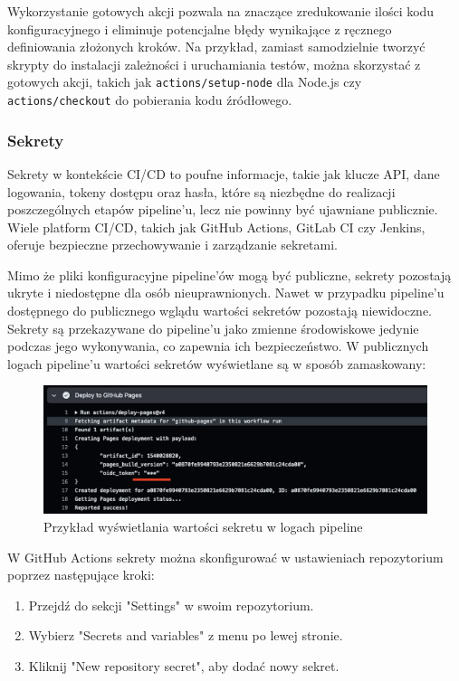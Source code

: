 \documentclass{article}
\begin{document}
Wykorzystanie gotowych akcji pozwala na znaczące zredukowanie ilości kodu konfiguracyjnego i eliminuje potencjalne błędy wynikające z ręcznego definiowania złożonych kroków. Na przykład, zamiast samodzielnie tworzyć skrypty do instalacji zależności i uruchamiania testów, można skorzystać z gotowych akcji, takich jak \lstinline|actions/setup-node| dla Node.js czy \lstinline|actions/checkout| do pobierania kodu źródłowego.

\subsubsection{Sekrety}

Sekrety w kontekście CI/CD to poufne informacje, takie jak klucze API, dane logowania, tokeny dostępu oraz hasła, które są niezbędne do realizacji poszczególnych etapów pipeline’u, lecz nie powinny być ujawniane publicznie. Wiele platform CI/CD, takich jak GitHub Actions, GitLab CI czy Jenkins, oferuje bezpieczne przechowywanie i zarządzanie sekretami.

Mimo że pliki konfiguracyjne pipeline’ów mogą być publiczne, sekrety pozostają ukryte i niedostępne dla osób nieuprawnionych. Nawet w przypadku pipeline’u dostępnego do publicznego wglądu wartości sekretów pozostają niewidoczne. Sekrety są przekazywane do pipeline’u jako zmienne środowiskowe jedynie podczas jego wykonywania, co zapewnia ich bezpieczeństwo. W publicznych logach pipeline'u wartości sekretów wyświetlane są w sposób zamaskowany:

\begin{figure}[H]
    \centering
    \includegraphics[width=1\linewidth]{actionsLogSecrets.png}
    \caption{Przykład wyświetlania wartości sekretu w logach pipeline}
    \label{fig:enter-label}
\end{figure}

W GitHub Actions sekrety można skonfigurować w ustawieniach repozytorium poprzez następujące kroki:

\begin{enumerate}
\item Przejdź do sekcji "Settings" w swoim repozytorium.
\item Wybierz "Secrets and variables" z menu po lewej stronie.
\item Kliknij "New repository secret", aby dodać nowy sekret.
\end{enumerate}
\end{document}
